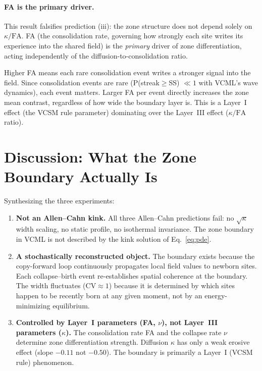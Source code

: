 \documentclass[11pt,a4paper]{article}
\begin{document}
\paragraph{FA is the primary driver.}
This result falsifies prediction (iii): the zone structure does not depend
solely on $\kappa/\mathrm{FA}$.  FA (the consolidation rate, governing how
strongly each site writes its experience into the shared field) is the
\emph{primary} driver of zone differentiation, acting independently of
the diffusion-to-consolidation ratio.

Higher FA means each rare consolidation event writes a stronger signal
into the field.  Since consolidation events are rare (P(streak$\geq$SS)
$\ll 1$ with VCML's wave dynamics), each event matters.  Larger FA per
event directly increases the zone mean contrast, regardless of how wide
the boundary layer is.  This is a Layer~I effect (the VCSM rule parameter)
dominating over the Layer~III effect ($\kappa/\mathrm{FA}$ ratio).

\section{Discussion: What the Zone Boundary Actually Is}

Synthesizing the three experiments:

\begin{enumerate}
  \item \textbf{Not an Allen--Cahn kink.}  All three Allen--Cahn predictions
  fail: no $\sqrt{\kappa}$ width scaling, no static profile, no isothermal
  invariance.  The zone boundary in VCML is not described by the kink
  solution of Eq.~\eqref{eq:pde}.

  \item \textbf{A stochastically reconstructed object.}  The boundary
  exists because the copy-forward loop continuously propagates local field
  values to newborn sites.  Each collapse--birth event re-establishes
  spatial coherence at the boundary.  The width fluctuates ($\mathrm{CV}\approx1$)
  because it is determined by which sites happen to be recently born at
  any given moment, not by an energy-minimizing equilibrium.

  \item \textbf{Controlled by Layer~I parameters (FA, $\nu$), not Layer~III
  parameters ($\kappa$).}  The consolidation rate FA and the collapse rate
  $\nu$ determine zone differentiation strength.  Diffusion $\kappa$ has
  only a weak erosive effect (slope $-0.11$ not $-0.50$).  The boundary is
  primarily a Layer~I (VCSM rule) phenomenon.
\end{enumerate}
\end{document}
